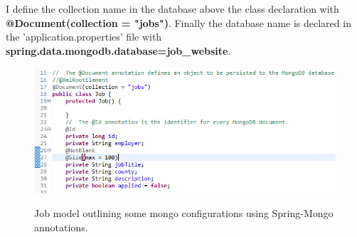 I define the collection name in the database above the class declaration with \textbf{@Document(collection = "jobs")}. Finally the database name is declared in the 'application.properties' file with \newline \textbf{spring.data.mongodb.database=job\_website}.

\begin{figure}[ht]
    \centering
    \includegraphics[scale=0.5]{Images/atlas3.png}
    \label{atlas3_label}
    \caption{Job model outlining some mongo configurations using Spring-Mongo annotations.}
\end{figure}

